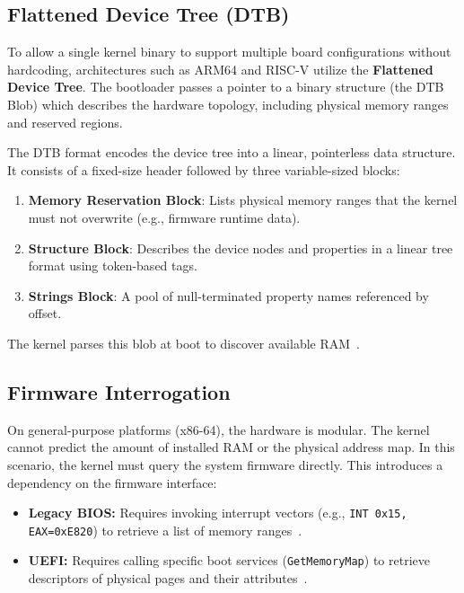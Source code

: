\documentclass[a4paper,10pt,twoside]{report}
\theoremstyle{definition}
\begin{document}
\subsection{Flattened Device Tree (DTB)}

To allow a single kernel binary to support multiple board configurations without hardcoding, architectures such as ARM64 and RISC-V utilize the \textbf{Flattened Device Tree}. The bootloader passes a pointer to a binary structure (the DTB Blob) which describes the hardware topology, including physical memory ranges and reserved regions.

The DTB format encodes the device tree into a linear, pointerless data structure. It consists of a fixed-size header followed by three variable-sized blocks:
\begin{enumerate}
    \item \textbf{Memory Reservation Block}: Lists physical memory ranges that the kernel must not overwrite (e.g., firmware runtime data).
    \item \textbf{Structure Block}: Describes the device nodes and properties in a linear tree format using token-based tags.
    \item \textbf{Strings Block}: A pool of null-terminated property names referenced by offset.
\end{enumerate}

The kernel parses this blob at boot to discover available RAM~\cite{Devicetree-Spec}.

\subsection{Firmware Interrogation}

On general-purpose platforms (x86-64), the hardware is modular. The kernel cannot predict the amount of installed RAM or the physical address map. In this scenario, the kernel must query the system firmware directly. This introduces a dependency on the firmware interface:
\begin{itemize}
    \item \textbf{Legacy BIOS:} Requires invoking interrupt vectors (e.g., \texttt{INT 0x15, EAX=0xE820}) to retrieve a list of memory ranges~\cite{osdev-int15}.
    \item \textbf{UEFI:} Requires calling specific boot services (\texttt{GetMemoryMap}) to retrieve descriptors of physical pages and their attributes~\cite{UEFI-Base-Spec}.
\end{itemize}
\end{document}
